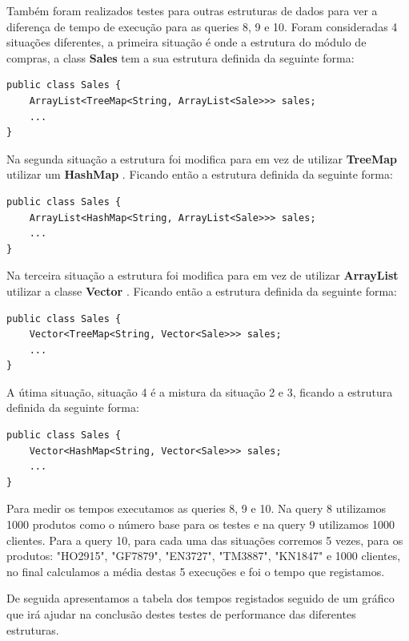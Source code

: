 \documentclass[10pt] {article}
\begin{document}
\newpage

\par Também foram realizados testes para outras estruturas de dados para ver a diferença de tempo de execução para as 
queries 8, 9 e 10. Foram consideradas 4 situações diferentes, a primeira situação é onde a estrutura do módulo de 
compras, a class \color{blue} \textbf{Sales} \color{black} tem a sua estrutura definida da seguinte forma:

\begin{lstlisting}
public class Sales {
	ArrayList<TreeMap<String, ArrayList<Sale>>> sales;
	...
}
\end{lstlisting}

\par Na segunda situação a estrutura foi modifica para em vez de utilizar \color{blue} \textbf{TreeMap} \color{black} utilizar um 
\color{blue} \textbf{HashMap} \color{black} . Ficando então a estrutura definida da seguinte forma:

\begin{lstlisting}
public class Sales {
	ArrayList<HashMap<String, ArrayList<Sale>>> sales;
	...
}
\end{lstlisting}

\par Na terceira situação a estrutura foi modifica para em vez de utilizar \color{blue} \textbf{ArrayList} \color{black} utilizar a 
classe  \color{blue} \textbf{Vector} \color{black} . Ficando então a estrutura definida da seguinte forma:

\begin{lstlisting}
public class Sales {
	Vector<TreeMap<String, Vector<Sale>>> sales;
	...
}
\end{lstlisting}

\par A útima situação, situação 4 é a mistura da situação 2 e 3, ficando a estrutura definida da seguinte forma:

\begin{lstlisting}
public class Sales {
	Vector<HashMap<String, Vector<Sale>>> sales;
	...
}
\end{lstlisting}

\par Para medir os tempos executamos as queries 8, 9 e 10. Na query 8 utilizamos 1000 produtos como o número base 
para os testes e na query 9 utilizamos 1000 clientes. Para a query 10, para cada uma das situações corremos 5 vezes, 
para os produtos: "HO2915", "GF7879", "EN3727", "TM3887", "KN1847" e 1000 clientes, no final calculamos a média destas 5 
execuções e foi o tempo que registamos.
\par De seguida apresentamos a tabela dos tempos registados seguido de um gráfico que irá ajudar na conclusão destes 
testes de performance das diferentes estruturas.
\end{document}

